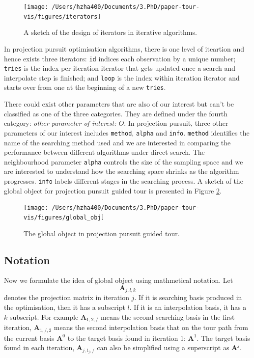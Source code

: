 \documentclass[12pt]{article}
\begin{document}
\begin{figure}
\texttt{[image: /Users/hzha400/Documents/3.PhD/paper-tour-vis/figures/iterators]} \caption{\label{iterators} A sketch of the design of iterators in iterative algorithms.}\label{fig:iterators}
\end{figure}

In projection pursuit optimisation algorithms, there is one level of
iteartion and hence exists three iterators: \texttt{id} indices each
observation by a unique number; \texttt{tries} is the index per
iteration iterator that gets updated once a search-and-interpolate step
is finished; and \texttt{loop} is the index within iteration iterator
and starts over from one at the beginning of a new \texttt{tries}.

There could exist other parameters that are also of our interest but
can't be classified as one of the three categories. They are defined
under the fourth category: \emph{other parameter of interest: \(O\)}. In
projection pursuit, three other parameters of our interest includes
\texttt{method}, \texttt{alpha} and \texttt{info}. \texttt{method}
identifies the name of the searching method used and we are interested
in comparing the performance between different algorithms under direct
search. The neighbourhood parameter \texttt{alpha} controls the size of
the sampling space and we are interested to understand how the searching
space shrinks as the algorithm progresses. \texttt{info} labels
different stages in the searching process. A sketch of the global object
for projection pursuit guided tour is presented in Figure
\ref{fig:glb-obj}.

\begin{figure}
\texttt{[image: /Users/hzha400/Documents/3.PhD/paper-tour-vis/figures/global\_obj]} \caption{\label{glb-obj}The global object in projection pursuit guided tour.}\label{fig:glb-obj}
\end{figure}

\hypertarget{notation}{%
\subsection{Notation}\label{notation}}

Now we formulate the idea of global object using mathmetical notation.
Let \[\mathbf{A}_{j,l,k}\] denotes the projection matrix in iteration
\(j\). If it is searching basis produced in the optimisation, then it
has a subscript \(l\). If it is an interpolation basis, it has a \(k\)
subscript. For example \(\mathbf{A}_{1,2,/}\) means the second searching
basis in the first iteration, \(\mathbf{A}_{1, /, 2}\) means the second
interpolation basis that on the tour path from the current basis
\(\mathbf{A}^0\) to the target basis found in iteration 1:
\(\mathbf{A}^1\). The target basis found in each iteration,
\(\mathbf{A}_{j, l_j, /}\) can also be simplified using a superscript as
\(\mathbf{A}^j\).
\end{document}
